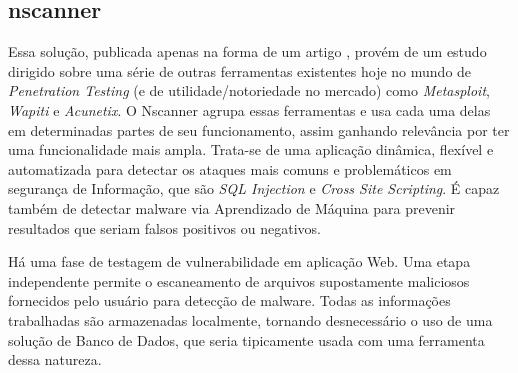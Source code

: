 \subsection{nscanner}
Essa solução, publicada apenas na forma de um artigo \cite{surian_nscanner_2020}, provém de um estudo dirigido sobre uma série de outras ferramentas existentes hoje no mundo de \textit{Penetration Testing} (e de utilidade/notoriedade no mercado) como \textit{Metasploit}, \textit{Wapiti} e\textit{ Acunetix}. O Nscanner agrupa essas ferramentas e usa cada uma delas em determinadas partes de seu funcionamento, assim ganhando relevância por ter uma funcionalidade mais ampla.  Trata-se de uma aplicação dinâmica, flexível e automatizada para detectar os ataques mais comuns e problemáticos em segurança de Informação, que são \textit{SQL Injection} e \textit{Cross Site Scripting}. É capaz também de detectar malware via Aprendizado de Máquina para prevenir resultados que seriam falsos positivos ou negativos.

Há uma fase de testagem de vulnerabilidade em aplicação Web. Uma etapa independente permite o escaneamento de arquivos supostamente maliciosos fornecidos pelo usuário para detecção de malware. Todas as informações trabalhadas são armazenadas localmente, tornando desnecessário o uso de uma solução de Banco de Dados, que seria tipicamente usada com uma ferramenta dessa natureza.

